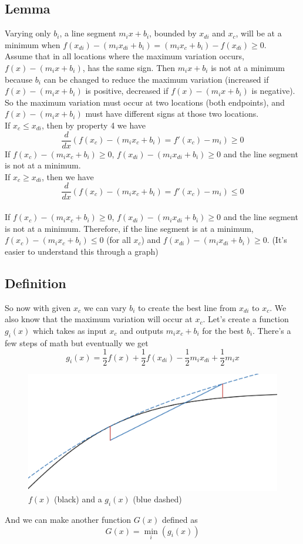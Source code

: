 \documentclass[a4paper,10pt,preprint,3p,hidelinks]{elsarticle}
\begin{document}
	\subsection{Lemma}
	Varying only $b_i$, a line segment $m_ix+b_i$, bounded by $x_{di}$ and $x_c$, will be at a minimum when $f(x_{di}) - (m_ix_{di}+b_i) = (m_ix_{c}+b_i) - f(x_{di}) \geq 0$. \\
	
	Assume that in all locations where the maximum variation occurs, $f(x) - (m_ix+b_i)$, has the same sign. Then $m_ix+b_i$ is not at a minimum because $b_i$ can be changed to reduce the maximum variation (increased if $f(x) - (m_ix+b_i)$ is positive, decreased if $f(x) - (m_ix+b_i)$ is negative). So the maximum variation must occur at two locations (both endpoints), and $f(x) - (m_ix+b_i)$ must have different signs at those two locations.\\
	
	If $x_c \leq x_{di}$, then by property 4 we have
	\[\frac d {dx} \left(f(x_c) - (m_ix_c+b_i) = f'(x_c) - m_i\right)\geq 0\]
	If $f(x_c) - (m_ix_c+b_i) \geq 0$, $f(x_{di}) - (m_ix_{di}+b_i) \geq 0$ and the line segment is not at a minimum.\\
	If $x_c \geq x_{di}$, then we have
	\[\frac d {dx} \left(f(x_c) - (m_ix_c+b_i) = f'(x_c) - m_i\right) \leq 0\]\\
	If $f(x_c) - (m_ix_c+b_i) \geq 0$, $f(x_{di}) - (m_ix_{di}+b_i) \geq 0$ and the line segment is not at a minimum. Therefore, if the line segment is at a minimum, $f(x_c) - (m_ix_c+b_i) \leq 0$ (for all $x_c$) and $f(x_{di}) - (m_ix_{di}+b_i) \geq 0$. (It's easier to understand this through a graph)
	
	\subsection{Definition}
	So now with given $x_c$ we can vary $b_i$ to create the best line from $x_{di}$ to $x_c$. We also know that the maximum variation will occur at $x_c$. Let's create a function $g_i(x)$ which takes as input $x_c$ and outputs $m_ix_c + b_i$ for the best $b_i$. There's a few steps of math but eventually we get
	\[g_i(x) = \frac 1 2 f(x) + \frac 1 2 f(x_{di}) - \frac 1 2 m_ix_{di} + \frac 1 2 m_ix\]
	\begin{figure}[H]
		\centering
		\includegraphics[width=5in]{figures/f-and-g.png}
		\caption{$f(x)$ (black) and a $g_i(x)$ (blue dashed)}
		\label{fig:f(x) with g(x)}
	\end{figure}
	And we can make another function $G(x)$ defined as 
	\[G(x) = \min_i(g_i(x))\]
\end{document}

